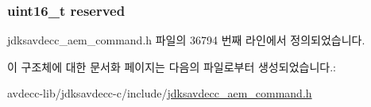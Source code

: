\subsubsection[{\texorpdfstring{reserved}{reserved}}]{\setlength{\rightskip}{0pt plus 5cm}uint16\+\_\+t reserved}\hypertarget{structjdksavdecc__aem__command__auth__get__key__response_a5a6ed8c04a3db86066924b1a1bf4dad3}{}\label{structjdksavdecc__aem__command__auth__get__key__response_a5a6ed8c04a3db86066924b1a1bf4dad3}


jdksavdecc\+\_\+aem\+\_\+command.\+h 파일의 36794 번째 라인에서 정의되었습니다.



이 구조체에 대한 문서화 페이지는 다음의 파일로부터 생성되었습니다.\+:\begin{DoxyCompactItemize}
\item 
avdecc-\/lib/jdksavdecc-\/c/include/\hyperlink{jdksavdecc__aem__command_8h}{jdksavdecc\+\_\+aem\+\_\+command.\+h}\end{DoxyCompactItemize}
